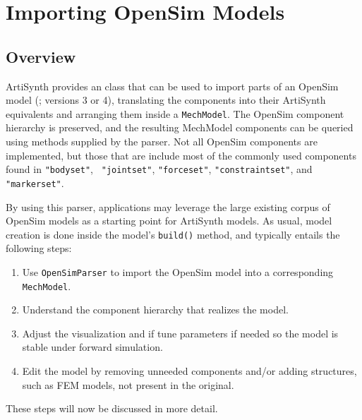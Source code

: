 \ifdefined\maindoc\else
\def\doctitle{Importing OpenSim Models}

\mainmatter
\fi

\chapter{Importing OpenSim Models}
\label{ImportingOpenSim:sec}

\section{Overview}

ArtiSynth provides an  class that can be used
to import parts of an OpenSim model (\cite{delp2007opensim}; versions 3 or 4),
translating the components into their ArtiSynth equivalents and arranging them
inside a {\tt MechModel}. The OpenSim component hierarchy is preserved, and the
resulting MechModel components can be queried using methods supplied by
the parser. Not all OpenSim components are implemented, but those that are
include most of the commonly used components found in {\tt "bodyset"}, {\tt
"jointset"}, {\tt "forceset"}, {\tt "constraintset"}, and {\tt "markerset"}.

By using this parser, applications may leverage the large existing corpus of
OpenSim models as a starting point for ArtiSynth models. As usual, model
creation is done inside the model's {\tt build()} method, and typically entails
the following steps:

\begin{enumerate}

\item Use {\tt OpenSimParser} to import the OpenSim model into a corresponding
{\tt MechModel}.

\item Understand the component hierarchy that realizes the model.

\item Adjust the visualization and if tune parameters if needed so the model is
stable under forward simulation.

\item Edit the model by removing unneeded components and/or adding
structures, such as FEM models, not present in the original.

\end{enumerate}

These steps will now be discussed in more detail.

